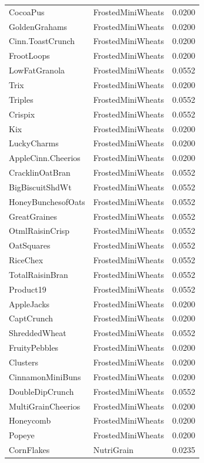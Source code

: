 \begin{longtable}{llr}
CocoaPus & FrostedMiniWheats & 0.0200 \\
GoldenGrahams & FrostedMiniWheats & 0.0200 \\
Cinn.ToastCrunch & FrostedMiniWheats & 0.0200 \\
FrootLoops & FrostedMiniWheats & 0.0200 \\
LowFatGranola & FrostedMiniWheats & 0.0552 \\
Trix & FrostedMiniWheats & 0.0200 \\
Triples & FrostedMiniWheats & 0.0552 \\
Crispix & FrostedMiniWheats & 0.0552 \\
Kix & FrostedMiniWheats & 0.0200 \\
LuckyCharms & FrostedMiniWheats & 0.0200 \\
AppleCinn.Cheerios & FrostedMiniWheats & 0.0200 \\
CracklinOatBran & FrostedMiniWheats & 0.0552 \\
BigBiscuitShdWt & FrostedMiniWheats & 0.0552 \\
HoneyBunchesofOats & FrostedMiniWheats & 0.0552 \\
GreatGraines & FrostedMiniWheats & 0.0552 \\
OtmlRaisinCrisp & FrostedMiniWheats & 0.0552 \\
OatSquares & FrostedMiniWheats & 0.0552 \\
RiceChex & FrostedMiniWheats & 0.0552 \\
TotalRaisinBran & FrostedMiniWheats & 0.0552 \\
Product19 & FrostedMiniWheats & 0.0552 \\
AppleJacks & FrostedMiniWheats & 0.0200 \\
CaptCrunch & FrostedMiniWheats & 0.0200 \\
ShreddedWheat & FrostedMiniWheats & 0.0552 \\
FruityPebbles & FrostedMiniWheats & 0.0200 \\
Clusters & FrostedMiniWheats & 0.0200 \\
CinnamonMiniBuns & FrostedMiniWheats & 0.0200 \\
DoubleDipCrunch & FrostedMiniWheats & 0.0552 \\
MultiGrainCheerios & FrostedMiniWheats & 0.0200 \\
Honeycomb & FrostedMiniWheats & 0.0200 \\
Popeye & FrostedMiniWheats & 0.0200 \\
CornFlakes & NutriGrain & 0.0235 \\

\end{longtable}
